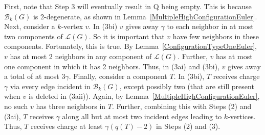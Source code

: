 \documentclass[12pt]{article}
\theoremstyle{plain}
\theoremstyle{definition}
\theoremstyle{remark}
\newcommand{\fancy}[1]{\mathcal{#1}}
\newcommand{\T}{\fancy{T}}
\newcommand{\B}{\fancy{B}}
\renewcommand{\L}{\fancy{L}}
\newcommand{\HH}{\fancy{H}}
\newcommand{\ch}{\operatorname{ch}}
\begin{document}
First, note that Step 3 will eventually result in Q being empty.  This is
because $\B_k(G)$ is 2-degenerate, as shown in
Lemma~\ref{MultipleHighConfigurationEuler}.  Next, consider a $k$-vertex $v$. 
In (3bi) $v$ gives away $\gamma$ to each neighbor in at most two components of
$\L(G)$.  So it is important that $v$ have few neighbors in these components. 
Fortunately, this is true.  By Lemma~\ref{ConfigurationTypeOneEuler}, $v$ has
at most 2 neighbors in any component of $\L(G)$.  Further, $v$ has at most one
component in which  it has 2 neighbors.  Thus, in (3ai) and (3bi), $v$ gives
away a total of at most $3\gamma$.  Finally, consider a component $T$.  In
(3bi), $T$ receives charge $\gamma$ via every edge incident in $\B_k(G)$,
except possibly two (that are still present when $v$ is deleted in (3aii)). 
Again, by Lemma~\ref{MultipleHighConfigurationEuler}, no such $v$ has three
neighbors in $T$.  Further, combining this with Steps (2) and (3ai), $T$
receives $\gamma$ along all but at most two incident edges leading to
$k$-vertices.  Thus, $T$ receives charge at least $\gamma(q(T)-2)$ in Steps (2)
and (3).


\end{document}

